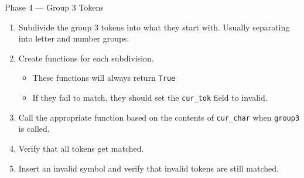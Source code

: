 \documentclass[handout]{beamer}
\begin{document}
\begin{frame}{Phase 4 --- Group 3 Tokens}
    \begin{enumerate}
        \item Subdivide the group 3 tokens into what they start with. Usually separating into letter and number groups.
        \item Create functions for each subdivision.
        \begin{itemize}
            \item These functions will always return \texttt{True}
            \item If they fail to match, they should set the \texttt{cur\_tok} field to invalid.
        \end{itemize}
        \item Call the appropriate function based on the contents of \texttt{cur\_char} when \texttt{group3} is called.
        \item Verify that all tokens get matched.
        \item Insert an invalid symbol and verify that invalid tokens are still matched.
    \end{enumerate}
\end{frame}
\end{document}
